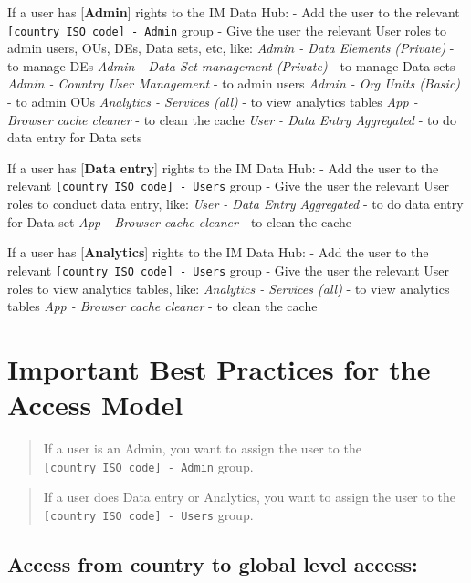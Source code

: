 \documentclass[]{book}
\begin{document}
If a user has {[}\textbf{Admin}{]} rights to the IM Data Hub:
- Add the user to the relevant \texttt{{[}country\ ISO\ code{]}\ -\ Admin} group
- Give the user the relevant User roles to admin users, OUs, DEs, Data sets, etc, like:
\emph{Admin - Data Elements (Private)} - to manage DEs
\emph{Admin - Data Set management (Private)} - to manage Data sets
\emph{Admin - Country User Management} - to admin users
\emph{Admin - Org Units (Basic)} - to admin OUs
\emph{Analytics - Services (all)} - to view analytics tables
\emph{App - Browser cache cleaner} - to clean the cache
\emph{User - Data Entry Aggregated} - to do data entry for Data sets

If a user has {[}\textbf{Data entry}{]} rights to the IM Data Hub:
- Add the user to the relevant \texttt{{[}country\ ISO\ code{]}\ -\ Users} group
- Give the user the relevant User roles to conduct data entry, like:
\emph{User - Data Entry Aggregated} - to do data entry for Data set
\emph{App - Browser cache cleaner} - to clean the cache

If a user has {[}\textbf{Analytics}{]} rights to the IM Data Hub:
- Add the user to the relevant \texttt{{[}country\ ISO\ code{]}\ -\ Users} group
- Give the user the relevant User roles to view analytics tables, like:
\emph{Analytics - Services (all)} - to view analytics tables
\emph{App - Browser cache cleaner} - to clean the cache

\hypertarget{important-best-practices-for-the-access-model}{%
\section{Important Best Practices for the Access Model}\label{important-best-practices-for-the-access-model}}

\begin{quote}
If a user is an Admin, you want to assign the user to the \texttt{{[}country\ ISO\ code{]}\ -\ Admin} group.
\end{quote}

\begin{quote}
If a user does Data entry or Analytics, you want to assign the user to the \texttt{{[}country\ ISO\ code{]}\ -\ Users} group.
\end{quote}

\hypertarget{access-from-country-to-global-level-access}{%
\subsection{Access from country to global level access:}\label{access-from-country-to-global-level-access}}
\end{document}
